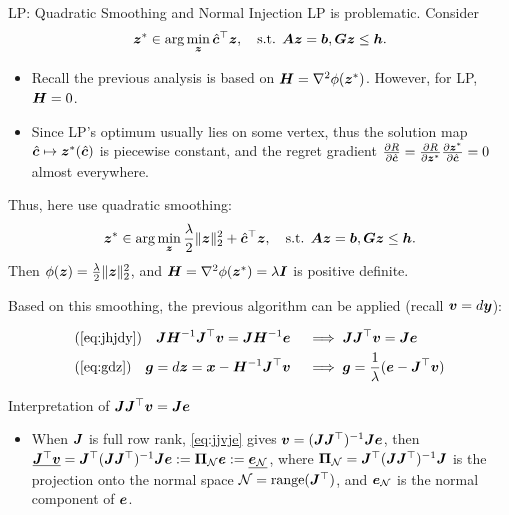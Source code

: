 \documentclass[10pt,aspectratio=169,xcolor=dvipsnames]{beamer}
\begin{document}
\begin{frame}[allowframebreaks]{LP: Quadratic Smoothing and Normal Injection}
    LP is problematic. Consider
    \begin{equation}
        {\bm{z}}^* \in \arg\min_{{\bm{z}}} \hat{{\bm{c}}}^\top {\bm{z}}, \quad \text{s.t. } {\bm{A}} {\bm{z}} = {\bm{b}}, {\bm{G}} {\bm{z}} \leq {\bm{h}}.
    \end{equation}
    \begin{itemize}
        \item Recall the previous analysis is based on ${\bm{H}} = \nabla^2 \phi({\bm{z}}^*)$. However, for LP, ${\bm{H}}=0$.
        \item Since LP's optimum usually lies on some vertex, thus the solution map $\hat{{\bm{c}}} \mapsto {\bm{z}}^*(\hat{{\bm{c}}})$ is piecewise constant, and the regret gradient $\frac{\partial R}{\partial \hat{{\bm{c}}}} = \frac{\partial R}{\partial {\bm{z}}^*} \frac{\partial {\bm{z}}^*}{\partial \hat{{\bm{c}}}} = 0$ almost everywhere.
    \end{itemize}

    Thus, here use quadratic smoothing:
    \begin{equation}
        {\bm{z}}^* \in \arg\min_{{\bm{z}}} \frac{\lambda}{2} \|{\bm{z}}\|_2^2 + \hat{{\bm{c}}}^\top {\bm{z}}, \quad \text{s.t. } {\bm{A}} {\bm{z}} = {\bm{b}}, {\bm{G}} {\bm{z}} \leq {\bm{h}}.
    \end{equation}
    Then $\phi({\bm{z}}) = \frac{\lambda}{2} \|{\bm{z}}\|_2^2$, and ${\bm{H}} = \nabla^2 \phi({\bm{z}}^*) = \lambda {\bm{I}}$ is positive definite.

    \newpage

    Based on this smoothing, the previous algorithm can be applied (recall ${\bm{v}} =  d{\bm{y}}$):

    \begin{align}
        &(\eqref{eq:jhjdy}) \quad  \mJ\mH^{-1}\mJ^\top \vv = \mJ\mH^{-1}\ve &&\implies \mJ\mJ^\top \vv = \mJ\ve \quad \label{eq:jjvje}\\
        &(\eqref{eq:gdz})\quad \vg = d\vz = \vx - \mH^{-1}\mJ^\top\vv &&\implies \vg =  \frac{1}{\lambda}(\ve - \mJ^\top \vv) \label{eq:ve_jtv}
    \end{align}
\begin{block}{\small{Interpretation of ${\bm{J}}{\bm{J}}^\top {\bm{v}} = {\bm{J}}{\bm{e}}$}}
    \begin{itemize}
        \item When ${\bm{J}}$ is full row rank, \eqref{eq:jjvje} gives ${\bm{v}} = ({\bm{J}}{\bm{J}}^\top)^{-1}{\bm{J}}{\bm{e}}$, then $\underline{{\bm{J}}^\top {\bm{v}}} = {\bm{J}}^\top ({\bm{J}}{\bm{J}}^\top)^{-1}{\bm{J}}{\bm{e}} := {\bm{\Pi}}_{\mathcal{N}} {\bm{e}} := \underline{{\bm{e}}_{\mathcal{N}}}$,
        where ${\bm{\Pi}}_{\mathcal{N}} = {\bm{J}}^\top ({\bm{J}} {\bm{J}}^\top)^{-1}{\bm{J}}$ is the projection onto the normal space $\mathcal{N} = \operatorname{range}({\bm{J}}^\top)$, and ${\bm{e}}_{\mathcal{N}}$ is the normal component of ${\bm{e}}$.


\end{itemize}
\end{block}
\end{frame}
\end{document}
